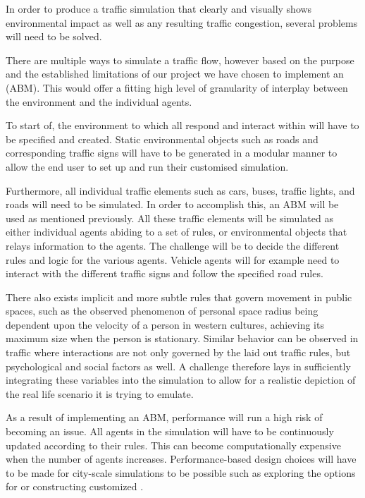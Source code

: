 In order to produce a traffic simulation that clearly and visually shows environmental impact as well as any resulting traffic congestion, several problems will need to be solved.

There are multiple ways to simulate a traffic flow, however based on the purpose and the established limitations of our project we have chosen to implement an \cite{agent-based-modeling} (ABM). This would offer a fitting high level of granularity of interplay between the environment and the individual agents. 

To start of, the environment to which all  respond and interact within will have to be specified and created. Static environmental objects such as roads and corresponding traffic signs will have to be generated in a modular manner to allow the end user to set up and run their customised simulation.

Furthermore, all individual traffic elements such as cars, buses, traffic lights, and roads will need to be simulated. In order to accomplish this, an ABM will be used as mentioned previously. All these traffic elements will be simulated as either individual agents abiding to a set of rules, or environmental objects that relays information to the agents. The challenge will be to decide the different rules and logic for the various agents. Vehicle agents will for example need to interact with the different traffic signs and follow the specified road rules.

There also exists implicit and more subtle rules that govern movement in public spaces, such as the observed phenomenon of personal space radius being dependent upon the velocity of a person in western cultures, achieving its maximum size when the person is stationary\cite{public-spaces}. Similar behavior can be observed in traffic where interactions are not only governed by the laid out traffic rules, but psychological and social factors as well\cite{social-interactions-av}. A challenge therefore lays in sufficiently integrating these variables into the simulation to allow for a realistic depiction of the real life scenario it is trying to emulate. 

As a result of implementing an ABM, performance will run a high risk of becoming an issue. All agents in the simulation will have to be continuously updated according to their rules. This can become computationally expensive when the number of agents increases. Performance-based design choices will have to be made for city-scale simulations to be possible such as exploring the options for  or constructing customized .

